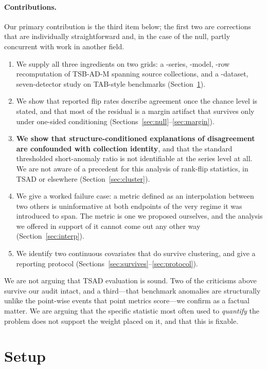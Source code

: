 \documentclass[twoside,11pt]{article}
\begin{document}
\paragraph{Contributions.} Our primary contribution is the third item below;
the first two are corrections that are individually straightforward and, in the
case of the null, partly concurrent with work in another field.
\begin{enumerate}
\item We supply all three ingredients on two grids: a \TsbadSeries-series,
  \TsbadModels-model, \TsbadRows-row recomputation of TSB-AD-M spanning
  \TsbadCollections{} source collections, and a \TabDatasets-dataset,
  seven-detector study on TAB-style benchmarks (Section~\ref{sec:setup}).
\item We show that reported flip rates describe agreement once the chance level
  is stated, and that most of the residual is a margin artifact that survives
  only under one-sided conditioning
  (Sections~\ref{sec:null}--\ref{sec:margin}).
\item \textbf{We show that structure-conditioned explanations of disagreement
  are confounded with collection identity}, and that the standard thresholded
  short-anomaly ratio is not identifiable at the series level at all. We are not
  aware of a precedent for this analysis of rank-flip statistics, in TSAD or
  elsewhere (Section~\ref{sec:cluster}).
\item We give a worked failure case: a metric defined as an interpolation
  between two others is uninformative at both endpoints of the very regime it
  was introduced to span. The metric is one we proposed ourselves, and the
  analysis we offered in support of it cannot come out any other way
  (Section~\ref{sec:interp}).
\item We identify two continuous covariates that do survive clustering, and
  give a reporting protocol (Sections~\ref{sec:survives}--\ref{sec:protocol}).
\end{enumerate}

We are not arguing that TSAD evaluation is sound. Two of the criticisms above
survive our audit intact, and a third---that benchmark anomalies are structurally
unlike the point-wise events that point metrics score---we confirm as a factual
matter. We are arguing that the specific statistic most often used to
\emph{quantify} the problem does not support the weight placed on it, and that
this is fixable.

\section{Setup}
\label{sec:setup}
\end{document}
